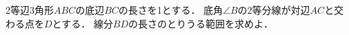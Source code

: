 \documentclass[../../main.tex]{subfiles}
\begin{document}
2等辺3角形$ABC$の底辺$BC$の長さを1とする．
底角$\angle B$の2等分線が対辺$AC$と交わる点を$D$とする．
線分$BD$の長さのとりうる範囲を求めよ．
\end{document}
